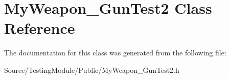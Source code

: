 \hypertarget{class_my_weapon___gun_test2}{}\section{My\+Weapon\+\_\+\+Gun\+Test2 Class Reference}
\label{class_my_weapon___gun_test2}


The documentation for this class was generated from the following file\+:\begin{DoxyCompactItemize}
\item 
Source/\+Testing\+Module/\+Public/My\+Weapon\+\_\+\+Gun\+Test2.\+h\end{DoxyCompactItemize}
